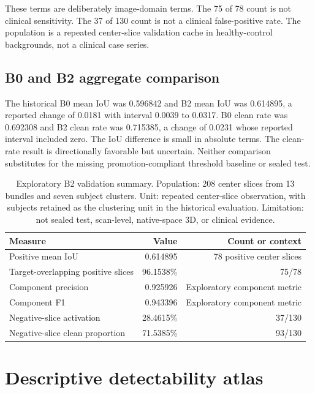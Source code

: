 \documentclass[11pt]{article}
\begin{document}
These terms are deliberately image-domain terms. The 75 of 78 count is not clinical sensitivity. The 37 of 130 count is not a clinical false-positive rate. The population is a repeated center-slice validation cache in healthy-control backgrounds, not a clinical case series.

\subsection{B0 and B2 aggregate comparison}

The historical B0 mean IoU was 0.596842 and B2 mean IoU was 0.614895, a reported change of 0.0181 with interval 0.0039 to 0.0317. B0 clean rate was 0.692308 and B2 clean rate was 0.715385, a change of 0.0231 whose reported interval included zero. The IoU difference is small in absolute terms. The clean-rate result is directionally favorable but uncertain. Neither comparison substitutes for the missing promotion-compliant threshold baseline or sealed test.

\begin{table}[H]
\centering
\caption{Exploratory B2 validation summary. Population: 208 center slices from 13 bundles and seven subject clusters. Unit: repeated center-slice observation, with subjects retained as the clustering unit in the historical evaluation. Limitation: not sealed test, scan-level, native-space 3D, or clinical evidence.}
\label{tab:b2}
\begin{tabular}{lrr}
\toprule
Measure & Value & Count or context \\
\midrule
Positive mean IoU & 0.614895 & 78 positive center slices \\
Target-overlapping positive slices & 96.1538\% & 75/78 \\
Component precision & 0.925926 & Exploratory component metric \\
Component F1 & 0.943396 & Exploratory component metric \\
Negative-slice activation & 28.4615\% & 37/130 \\
Negative-slice clean proportion & 71.5385\% & 93/130 \\
\bottomrule
\end{tabular}
\end{table}

\section{Descriptive detectability atlas}
\end{document}
